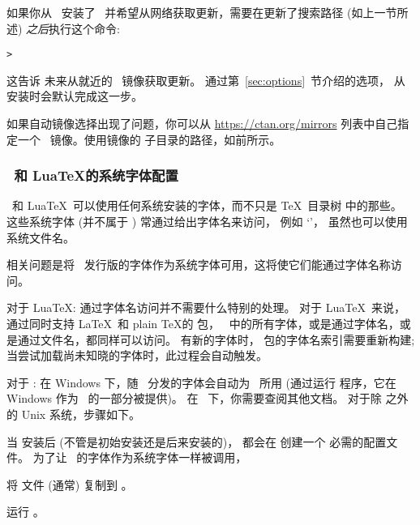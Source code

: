 \documentclass{article}
\begin{document}
如果你从 \DVD\ 安装了 \TL\ 并希望从网络获取更新，需要在更新了搜索路径
(如上一节所述) \emph{之后}执行这个命令: 

\begin{alltt}
> 
\end{alltt}

这告诉  未来从就近的 \CTAN\ 镜像获取更新。
通过第~\ref{sec:options}~节介绍的选项，
从 \DVD{} 安装时会默认完成这一步。

如果自动镜像选择出现了问题，你可以从 \url{https://ctan.org/mirrors}
列表中自己指定一个 \CTAN\ 镜像。使用镜像的 
子目录的路径，如前所示。

\subsubsection{\protect\XeTeX\protect\ 和 Lua\protect\TeX 的系统字体配置}
\label{sec:font-conf-sys}

\XeTeX\ 和 Lua\TeX\ 可以使用任何系统安装的字体，而不只是 \TeX\ 目录树
中的那些。
这些系统字体 (并不属于 \TL) 常通过给出字体名来访问，
例如 `'，
虽然也可以使用系统文件名。

相关问题是将 \TL\ 发行版的字体作为系统字体可用，这将使它们能通过字体名称访问。

对于 Lua\TeX: 
通过字体名访问并不需要什么特别的处理。
对于 Lua\TeX\ 来说，
通过同时支持 \LaTeX\ 和 plain \TeX 的  包，
\TL\ 中的所有字体，或是通过字体名，或是通过文件名，都同样可以访问。
有新的字体时， 包的字体名索引需要重新构建; 
当尝试加载尚未知晓的字体时，此过程会自动触发。

对于  \XeTeX: 
在 Windows 下，随 \TL\ 分发的字体会自动为 \XeTeX\ 所用
(通过运行  程序，它在 Windows 作为 \TL\ 的一部分被提供)。
在 \macOS{}\ 下，你需要查阅其他文档。
对于除 \macOS 之外的 Unix 系统，步骤如下。

当  安装后 (不管是初始安装还是后来安装的)，
都会在
 创建一个
必需的配置文件。
为了让 \TL\ 的字体作为系统字体一样被调用，
\begin{enumerate*}
\item 将  文件 (通常) 复制到
。
\item 运行 。
\end{enumerate*}
\end{document}
